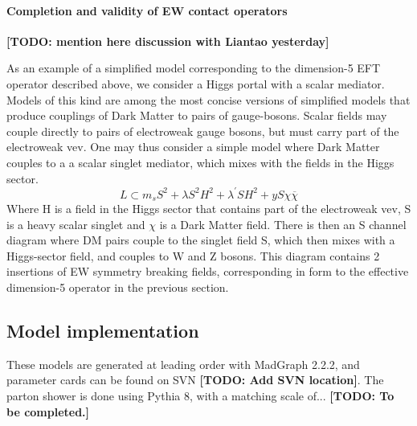 \paragraph{Completion and validity of EW contact operators}

\textbf{[TODO: mention here discussion with Liantao yesterday]}


As an example of a simplified model corresponding to the dimension-5 EFT operator 
described above, we consider a Higgs portal with a scalar mediator. Models of this kind
are among the most concise versions of simplified models that produce 
couplings of Dark Matter to pairs of gauge-bosons.  Scalar fields may couple directly to pairs of electroweak gauge bosons, 
but must carry part of the electroweak vev.  One may thus consider a simple model where Dark Matter couples to a a scalar 
singlet mediator, which mixes with the fields in the Higgs sector.
\begin{equation}
L\subset m_s S^2 + \lambda S^2H^2 +\lambda^{'} S H^2 + y S \chi \overline{\chi}
\end{equation}
Where H is a field in the Higgs sector that contains part of the electroweak vev, 
S is a heavy scalar singlet and $\chi$ is a Dark Matter field. 
There is then an S channel diagram where DM pairs couple to the singlet field S, 
which then mixes with a Higgs-sector field, and couples to W and Z bosons. 
This diagram contains 2 insertions of EW symmetry breaking fields, 
corresponding in form to the effective dimension-5 operator in the previous section.   

\subsection{Model implementation}

These models are generated at leading order with MadGraph 2.2.2, and parameter
cards can be found on SVN \textbf{[TODO: Add SVN location]}.
The parton shower is done using Pythia 8, with a matching scale of...
\textbf{[TODO: To be completed.]}
